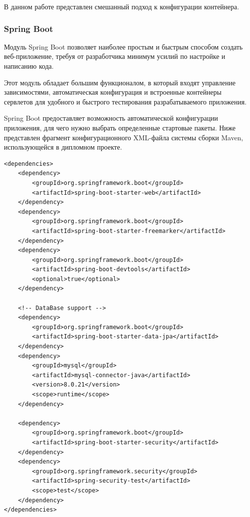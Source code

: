 \documentclass[a4paper]{article}
\begin{document}
В данном работе представлен смешанный подход к конфигурации контейнера.

\subsubsection{Spring Boot}

Модуль Spring Boot позволяет наиболее простым и быстрым способом создать веб-приложение, требуя от разработчика минимум усилий по настройке и написанию кода.

Этот модуль обладает большим функционалом, в который входят управление зависимостями,  автоматическая конфигурация и встроенные контейнеры сервлетов для удобного и быстрого тестирования разрабатываемого приложения.

Spring Boot предоставляет возможность автоматической конфигурации приложения, для чего нужно выбрать определенные стартовые пакеты. Ниже представлен фрагмент конфигурационного XML-файла системы сборки Maven, использующейся в дипломном проекте.
\hfill\break
{}         
\begin{lstlisting}[label=lis1,caption=Зависимости Maven]                
<dependencies>
    <dependency>
        <groupId>org.springframework.boot</groupId>
        <artifactId>spring-boot-starter-web</artifactId>
    </dependency>
    <dependency>
        <groupId>org.springframework.boot</groupId>
        <artifactId>spring-boot-starter-freemarker</artifactId>
    </dependency>
    <dependency>
        <groupId>org.springframework.boot</groupId>
        <artifactId>spring-boot-devtools</artifactId>
        <optional>true</optional>
    </dependency>

    <!-- DataBase support -->
    <dependency>
        <groupId>org.springframework.boot</groupId>
        <artifactId>spring-boot-starter-data-jpa</artifactId>
    </dependency>
    <dependency>
        <groupId>mysql</groupId>
        <artifactId>mysql-connector-java</artifactId>
        <version>8.0.21</version>
        <scope>runtime</scope>
    </dependency>

    <dependency>
        <groupId>org.springframework.boot</groupId>
        <artifactId>spring-boot-starter-security</artifactId>
    </dependency>
    <dependency>
        <groupId>org.springframework.security</groupId>
        <artifactId>spring-security-test</artifactId>
        <scope>test</scope>
    </dependency>
</dependencies>
\end{lstlisting}    
\end{document}
